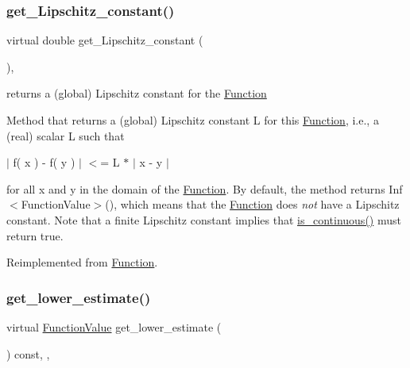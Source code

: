 \subsubsection{\texorpdfstring{get\+\_\+\+Lipschitz\+\_\+constant()}{get\_Lipschitz\_constant()}}
{\footnotesize\ttfamily virtual double get\+\_\+\+Lipschitz\+\_\+constant (\begin{DoxyParamCaption}\item[{void}]{ }\end{DoxyParamCaption})\hspace{0.3cm}{\ttfamily [override]}, {\ttfamily [virtual]}}



returns a (global) Lipschitz constant for the \mbox{\hyperlink{class_s_m_spp__di__unipi__it_1_1_function}{Function}} 

Method that returns a (global) Lipschitz constant L for this \mbox{\hyperlink{class_s_m_spp__di__unipi__it_1_1_function}{Function}}, i.\+e., a (real) scalar L such that

$\vert$ f( x ) -\/ f( y ) $\vert$ $<$= L $\ast$ $\vert$ x -\/ y $\vert$

for all x and y in the domain of the \mbox{\hyperlink{class_s_m_spp__di__unipi__it_1_1_function}{Function}}. By default, the method returns Inf$<$\+Function\+Value$>$(), which means that the \mbox{\hyperlink{class_s_m_spp__di__unipi__it_1_1_function}{Function}} does {\itshape not} have a Lipschitz constant. Note that a finite Lipschitz constant implies that \mbox{\hyperlink{class_s_m_spp__di__unipi__it_1_1_function_a59de57710aa301d293e9126e3fb975bf}{is\+\_\+continuous()}} must return true. 

Reimplemented from \mbox{\hyperlink{class_s_m_spp__di__unipi__it_1_1_function_a472422601268368c33568731d4bb0f19}{Function}}.

\mbox{\label{class_s_m_spp__di__unipi__it_1_1_d_quad_function_a33520123d0919481e4f7cc5bc6da28a9}} 
\subsubsection{\texorpdfstring{get\+\_\+lower\+\_\+estimate()}{get\_lower\_estimate()}}
{\footnotesize\ttfamily virtual \mbox{\hyperlink{class_s_m_spp__di__unipi__it_1_1_function_a9ad432406b609e28d340f73e9474bffe}{Function\+Value}} get\+\_\+lower\+\_\+estimate (\begin{DoxyParamCaption}\item[{void}]{ }\end{DoxyParamCaption}) const\hspace{0.3cm}{\ttfamily [inline]}, {\ttfamily [override]}, {\ttfamily [virtual]}}



